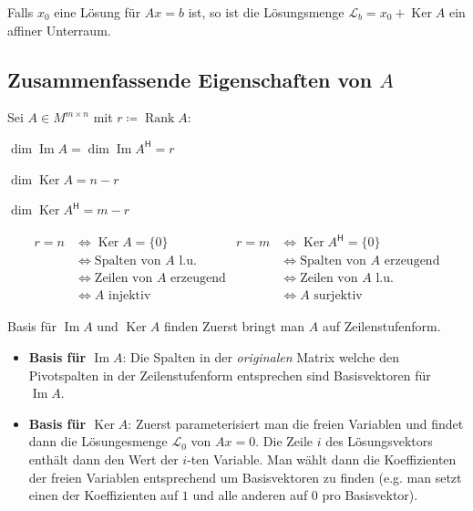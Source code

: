 \documentclass[a4paper,10pt]{article}
\DeclareMathOperator{\Rank}{Rank}
\DeclareMathOperator{\Image}{Im}
\DeclareMathOperator{\Kernel}{Ker}
\newcommand*{\hermconj}{\mathsf{H}}
\begin{document}
Falls $x_0$ eine Lösung für $Ax = b$ ist, so ist die Lösungsmenge $\mathcal{L}_b = x_0 + \Kernel A$ ein affiner Unterraum.

\subsection{Zusammenfassende Eigenschaften von $A$}

Sei $A \in M^{m \times n}$ mit $r \coloneqq \Rank A$:

\begin{rowlist}
  \item $\dim \Image A = \dim \Image A^\hermconj = r$
  \item $\dim \Kernel A = n - r$
  \item $\dim \Kernel A^\hermconj = m - r$
\end{rowlist}

\begin{align*}
  r = n & \Leftrightarrow \Kernel A = \{ 0 \} & r = m & \Leftrightarrow \Kernel A^\hermconj = \{ 0 \} \\
  & \Leftrightarrow \text{Spalten von $A$ l.u.} & & \Leftrightarrow \text{Spalten von $A$ erzeugend}\\
  & \Leftrightarrow \text{Zeilen von $A$ erzeugend} & & \Leftrightarrow \text{Zeilen von $A$ l.u.}\\
  & \Leftrightarrow A \text{ injektiv} & & \Leftrightarrow A \text{ surjektiv}
\end{align*}

\begin{subbox}{Basis für $\Image A$ und $\Kernel A$ finden}
  Zuerst bringt man $A$ auf Zeilenstufenform.
  \begin{itemize}
    \item \textbf{Basis für $\Image A$}: Die Spalten in der \textit{originalen} Matrix welche den Pivotspalten in der Zeilenstufenform entsprechen sind Basisvektoren für $\Image A$.
    \item \textbf{Basis für $\Kernel A$}: Zuerst parameterisiert man die freien Variablen und findet dann die Lösungesmenge $\mathcal{L}_0$ von $Ax = 0$. Die Zeile $i$ des Lösungsvektors enthält dann den Wert der $i$-ten Variable. Man wählt dann die Koeffizienten der freien Variablen entsprechend um Basisvektoren zu finden (e.g. man setzt einen der Koeffizienten auf $1$ und alle anderen auf $0$ pro Basisvektor). 
  \end{itemize}
\end{subbox}
\end{document}
